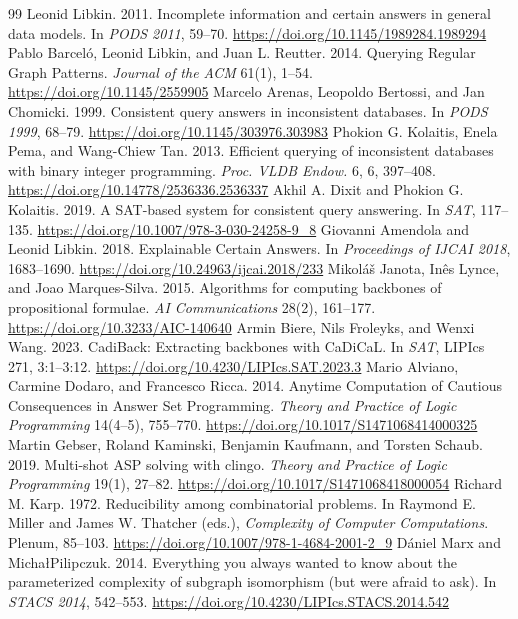 \begin{thebibliography}{99}
 Leonid Libkin. 2011. Incomplete information and certain answers in general data models. In \textit{PODS 2011}, 59--70. \url{https://doi.org/10.1145/1989284.1989294}
 Pablo Barcel\'o, Leonid Libkin, and Juan L. Reutter. 2014. Querying Regular Graph Patterns. \textit{Journal of the ACM} 61(1), 1--54. \url{https://doi.org/10.1145/2559905}
 Marcelo Arenas, Leopoldo Bertossi, and Jan Chomicki. 1999. Consistent query answers in inconsistent databases. In \textit{PODS 1999}, 68--79. \url{https://doi.org/10.1145/303976.303983}
 Phokion G. Kolaitis, Enela Pema, and Wang-Chiew Tan. 2013. Efficient querying of inconsistent databases with binary integer programming. \textit{Proc. VLDB Endow.} 6, 6, 397--408. \url{https://doi.org/10.14778/2536336.2536337}
 Akhil A. Dixit and Phokion G. Kolaitis. 2019. A SAT-based system for consistent query answering. In \textit{SAT}, 117--135. \url{https://doi.org/10.1007/978-3-030-24258-9_8}
 Giovanni Amendola and Leonid Libkin. 2018. Explainable Certain Answers. In \textit{Proceedings of IJCAI 2018}, 1683--1690. \url{https://doi.org/10.24963/ijcai.2018/233}
 Mikol\'a\v{s} Janota, In\^es Lynce, and Joao Marques-Silva. 2015. Algorithms for computing backbones of propositional formulae. \textit{AI Communications} 28(2), 161--177. \url{https://doi.org/10.3233/AIC-140640}
 Armin Biere, Nils Froleyks, and Wenxi Wang. 2023. CadiBack: Extracting backbones with CaDiCaL. In \textit{SAT}, LIPIcs 271, 3:1--3:12. \url{https://doi.org/10.4230/LIPIcs.SAT.2023.3}
 Mario Alviano, Carmine Dodaro, and Francesco Ricca. 2014. Anytime Computation of Cautious Consequences in Answer Set Programming. \textit{Theory and Practice of Logic Programming} 14(4--5), 755--770. \url{https://doi.org/10.1017/S1471068414000325}
 Martin Gebser, Roland Kaminski, Benjamin Kaufmann, and Torsten Schaub. 2019. Multi-shot ASP solving with clingo. \textit{Theory and Practice of Logic Programming} 19(1), 27--82. \url{https://doi.org/10.1017/S1471068418000054}
 Richard M. Karp. 1972. Reducibility among combinatorial problems. In Raymond E. Miller and James W. Thatcher (eds.), \textit{Complexity of Computer Computations}. Plenum, 85--103. \url{https://doi.org/10.1007/978-1-4684-2001-2_9}
 D\'aniel Marx and Micha\l Pilipczuk. 2014. Everything you always wanted to know about the parameterized complexity of subgraph isomorphism (but were afraid to ask). In \textit{STACS 2014}, 542--553. \url{https://doi.org/10.4230/LIPIcs.STACS.2014.542}

\end{thebibliography}
